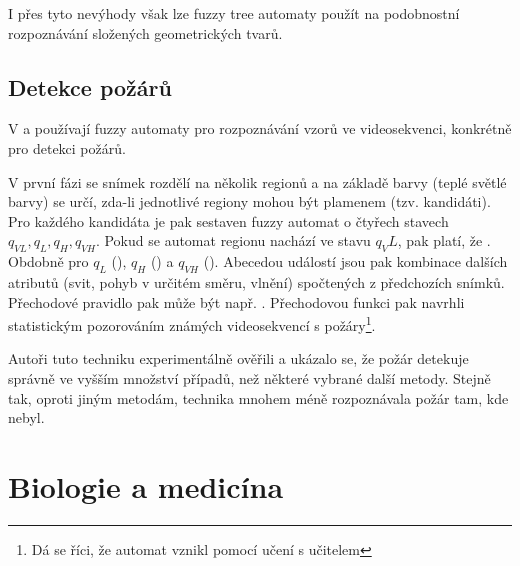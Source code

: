 \documentclass[a4paper,10pt]{article}
\begin{document}
I přes tyto nevýhody však lze fuzzy tree automaty použít na podobnostní rozpoznávání složených geometrických tvarů.




\subsection{Detekce požárů}
V \cite{HamKoNam-FirFlaDetBasFuzFinAut} a \cite{KoHamNam-ModForFuFiAuDetIrrFirFla} používají fuzzy automaty pro rozpoznávání vzorů ve videosekvenci, konkrétně pro detekci požárů.

V první fázi se snímek rozdělí na několik regionů a na základě barvy (teplé světlé barvy) se určí, zda-li jednotlivé regiony mohou být plamenem (tzv. kandidáti). Pro každého kandidáta je pak sestaven fuzzy automat o čtyřech stavech $q_{VL}, q_{L}, q_{H}, q_{VH}$. Pokud se automat regionu nachází ve stavu $q_VL$, pak platí, že . Obdobně pro $q_{L}$ (), $q_{H}$ () a $q_{VH}$ (). Abecedou událostí jsou pak kombinace dalších atributů (svit, pohyb v určitém směru, vlnění) spočtených z předchozích snímků. Přechodové pravidlo pak může být např. . Přechodovou funkci pak navrhli statistickým pozorováním známých videosekvencí s požáry\footnote{Dá se říci, že automat vznikl pomocí učení s učitelem}.

Autoři tuto techniku experimentálně ověřili a ukázalo se, že požár detekuje správně ve vyšším množství případů, než některé vybrané další metody. Stejně tak, oproti jiným metodám, technika mnohem méně rozpoznávala požár tam, kde nebyl.



\section{Biologie a medicína}
\end{document}
